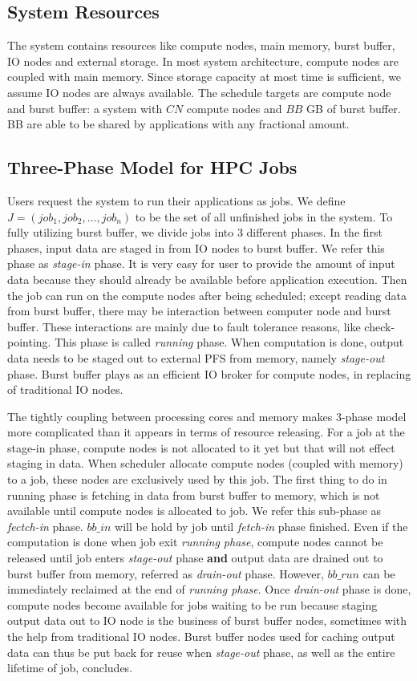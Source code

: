 \subsection{System Resources}
The system contains resources like compute nodes, main memory, burst buffer,
IO nodes and external storage.
In most system architecture, compute nodes are coupled with main memory.
Since storage capacity at most time is sufficient, we assume IO nodes are always available.
The schedule targets are compute node and burst buffer:
a system with $CN$ compute nodes and $BB$ GB of burst buffer.
BB are able to be shared by applications with any fractional amount.

\subsection{Three-Phase Model for HPC Jobs}
Users request the system to run their applications as jobs.
We define $J = (job_1, job_2, \ldots, job_n)$ to be the set of all unfinished jobs in the system.
To fully utilizing burst buffer, we divide jobs into 3 different phases.
In the first phases, input data are staged in from IO nodes to burst buffer.
We refer this phase as \textit{stage-in} phase.
It is very easy for user to provide the amount of input data
because they should already be available before application execution. 
Then the job can run on the compute nodes after being scheduled;
except reading data from burst buffer, there may be interaction between 
computer node and burst buffer.
These interactions are mainly due to fault tolerance reasons, like check-pointing.
This phase is called \textit{running} phase.
When computation is done, output data needs to be staged out to external PFS from memory,
namely \textit{stage-out} phase.
Burst buffer plays as an efficient IO broker for compute nodes,
in replacing of traditional IO nodes.

The tightly coupling between processing cores and memory makes 3-phase model
more complicated than it appears in terms of resource releasing.
For a job at the stage-in phase, compute nodes is not allocated to it yet
but that will not effect staging in data.
When scheduler allocate compute nodes (coupled with memory) to a job,
these nodes are exclusively used by this job.
The first thing to do in running phase is fetching in data from burst buffer to memory,
which is not available until compute nodes is allocated to job.
We refer this sub-phase as \textit{fectch-in} phase.
$bb\_in$ will be hold by job until \textit{fetch-in} phase finished.
Even if the computation is done when job exit \textit{running phase},
compute nodes cannot be released until job enters \textit{stage-out} phase 
\textbf{and} output data are drained out to burst buffer from memory,
referred as \textit{drain-out} phase.
However, $bb\_run$ can be immediately reclaimed at the end of \textit{running phase}.
Once \textit{drain-out} phase is done,
compute nodes become available for jobs waiting to be run
because staging output data out to IO node is the business of burst buffer nodes,
sometimes with the help from traditional IO nodes.
Burst buffer nodes used for caching output data can thus be put back for reuse
when \textit{stage-out} phase, as well as the entire lifetime of job, concludes.


